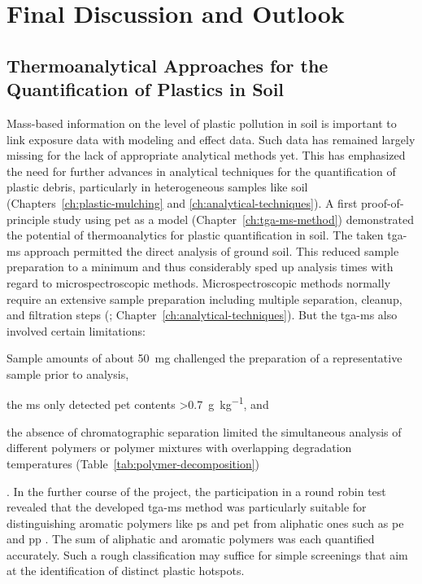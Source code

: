 
\chapter{Final Discussion and Outlook}
\label{ch:general-discussion}

\section{Thermoanalytical Approaches for the Quantification of Plastics in Soil}
\label{sec:general-discussion:analytics}

Mass-based information on the level of plastic pollution in soil is important to link exposure data with modeling and effect data. Such data has remained largely missing for the lack of appropriate analytical methods yet. This has emphasized the need for further advances in analytical techniques for the quantification of plastic debris, particularly in heterogeneous samples like soil (Chapters~\ref{ch:plastic-mulching} and \ref{ch:analytical-techniques}).
A first proof-of-principle study using \ac{pet} as a model (Chapter~\ref{ch:tga-ms-method}) demonstrated the potential of thermoanalytics for plastic quantification in soil. The taken \ac{tga-ms} approach permitted the direct analysis of ground soil. This reduced sample preparation to a minimum and thus considerably sped up analysis times with regard to microspectroscopic methods. Microspectroscopic methods normally require an extensive sample preparation including multiple separation, cleanup, and filtration steps (\citealp[for instance,][]{LoderEnzymatic2017}; Chapter~\ref{ch:analytical-techniques}). But the \ac{tga-ms} also involved certain limitations:
\begin{enumerate*}
	\item Sample amounts of about \SI{50}{\milli\gram} challenged the preparation of a representative sample prior to analysis,
	\item the \ac{ms} only detected \ac{pet} contents \SI{>0.7}{\gram\per\kilo\gram}, and
	\item the absence of chromatographic separation limited the simultaneous analysis of different polymers or polymer mixtures with overlapping degradation temperatures (Table~\ref{tab:polymer-decomposition})
\end{enumerate*}.
In the further course of the project, the participation in a round robin test revealed that the developed \ac{tga-ms} method was particularly suitable for distinguishing aromatic polymers like \ac{ps} and \ac{pet} from aliphatic ones such as \ac{pe} and \ac{pp} \citep{BeckerQuantification2020}. The sum of aliphatic and aromatic polymers was each quantified accurately. Such a rough classification may suffice for simple screenings that aim at the identification of distinct plastic hotspots.
